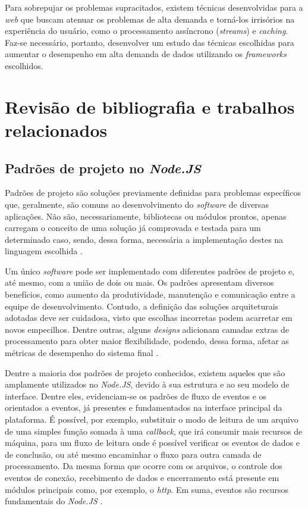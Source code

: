 \documentclass[12pt]{article}
\begin{document}
Para sobrepujar os problemas supracitados, existem técnicas desenvolvidas para a \textit{web} que buscam
atenuar os problemas de alta demanda e torná-los irrisórios na experiência do usuário, como o processamento
assíncrono (\textit{streams}) e \textit{caching}. Faz-se necessário, portanto, desenvolver um estudo das 
técnicas escolhidas para aumentar o desempenho em alta demanda de dados utilizando os \textit{frameworks} 
escolhidos.


\section{Revisão de bibliografia e trabalhos relacionados}

\subsection{Padrões de projeto no \textit{Node.JS}}

Padrões de projeto são soluções previamente definidas para problemas específicos que, geralmente,
são comuns ao desenvolvimento do \textit{software} de diversas aplicações. Não são, necessariamente, 
bibliotecas ou módulos prontos, apenas carregam o conceito de uma solução já comprovada e testada para um 
determinado caso, sendo, dessa forma, necessária a implementação destes na 
linguagem escolhida \cite[p. 13]{DIOGORESENDE}.

Um único \textit{software} pode ser implementado com diferentes padrões de projeto e, até mesmo, com a união
de dois ou mais. Os padrões apresentam diversos benefícios, como aumento da produtividade, manutenção e comunicação
entre a equipe de desenvolvimento. Contudo, a definição das soluções arquiteturais adotadas deve ser 
cuidadosa, visto que escolhas incorretas podem acarretar em novos empecilhos. Dentre outras, 
alguns \textit{designs} adicionam camadas extras de processamento para obter maior flexibilidade, podendo, dessa forma, 
afetar as métricas de desempenho do sistema final \cite[p. 13 - p. 14]{DIOGORESENDE}.

Dentre a maioria dos padrões de projeto conhecidos, existem aqueles que são amplamente utilizados no 
\textit{Node.JS}, devido à sua estrutura e ao seu modelo de interface. Dentre eles, evidenciam-se
os padrões de fluxo de eventos e os orientados a eventos, já presentes e fundamentados na interface principal 
da plataforma. É possível, por exemplo, substituir o modo de leitura de um arquivo de 
uma simples função somada à uma \textit{callback}, que irá consumir mais recursos de máquina, para um fluxo de 
leitura onde é possível verificar os eventos de dados e de conclusão, ou até mesmo encaminhar o fluxo para 
outra camada de processamento. Da mesma forma que ocorre com os arquivos, o controle dos eventos 
de conexão, recebimento de dados e encerramento está presente em módulos principais como, por exemplo, 
o \textit{http}. Em suma, eventos são recursos fundamentais do \textit{Node.JS} \cite[p. 15]{DIOGORESENDE}.
\end{document}
